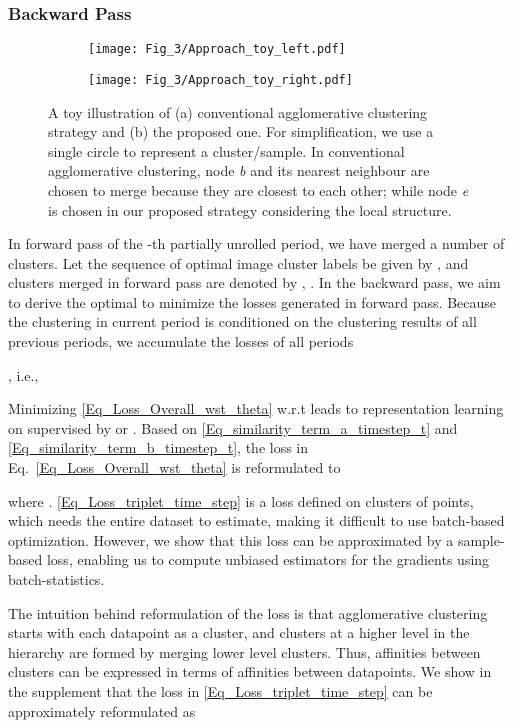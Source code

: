 \documentclass[10pt,twocolumn,letterpaper]{article}
\begin{document}
{\subsubsection{Backward Pass}
\begin{figure}[t]
   \begin{subfigure}{0.48\linewidth}
   \centering
    \texttt{[image: Fig\_3/Approach\_toy\_left.pdf]}
    \caption{}
   \end{subfigure}
   \begin{subfigure}{0.48\linewidth}
   \centering
    \texttt{[image: Fig\_3/Approach\_toy\_right.pdf]}
    \caption{}
   \end{subfigure}
   \caption{A toy illustration of (a) conventional agglomerative clustering strategy and (b) the proposed one. For simplification, we use a single circle to represent a cluster/sample. In conventional agglomerative clustering, node \textit{b} and its nearest neighbour are chosen to merge because they are closest to each other; while node \textit{e} is chosen {in our proposed strategy} considering the local structure.} 
\label{Fig_Approach_ToyExample}
\end{figure}
{In forward pass of the -th partially unrolled period, we have merged a number of clusters. {Let the sequence of optimal image cluster labels be given by} , and clusters merged in forward pass are denoted by , .} In the backward pass, we aim to derive the optimal  to minimize the losses generated in forward pass. Because the clustering in current period is conditioned on the clustering results of all previous periods, {we {accumulate} the losses of all  periods}}, i.e.,



Minimizing \eqref{Eq_Loss_Overall_wst_theta} w.r.t  leads to representation learning on  supervised by  or . Based on \eqref{Eq_similarity_term_a_timestep_t} and \eqref{Eq_similarity_term_b_timestep_t}, {the loss in Eq.~\ref{Eq_Loss_Overall_wst_theta} is reformulated to}

where . {\eqref{Eq_Loss_triplet_time_step} is a loss defined on clusters of points, which needs the entire dataset to estimate, making it difficult to use batch-based optimization.} However, we show that this loss can be approximated by a sample-based loss, enabling us to compute unbiased estimators for the gradients using batch-statistics. 

The intuition behind reformulation of the loss is that agglomerative clustering starts with each datapoint as a cluster, and clusters at a higher level in the hierarchy are formed by merging lower level clusters. Thus, affinities between clusters can be expressed in terms of affinities between datapoints. We show in the supplement that the loss in \eqref{Eq_Loss_triplet_time_step} can be approximately reformulated as
\end{document}
